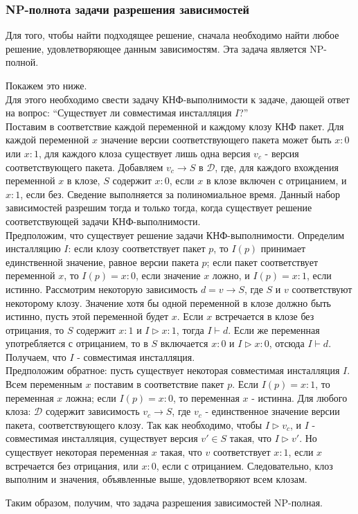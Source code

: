 \subsubsection{NP-полнота задачи разрешения зависимостей}
Для того, чтобы найти подходящее решение, сначала необходимо найти любое
решение, удовлетворяющее данным зависимостям. Эта задача является NP-полной.

Покажем это ниже.\\

Для этого необходимо свести задачу КНФ-выполнимости к задаче, дающей ответ на 
вопрос: ``Существует ли совместимая инсталляция $I$?''\\

Поставим в соответствие каждой переменной и каждому клозу КНФ пакет. Для
каждой переменной $x$ значение версии соответствующего пакета может быть
$x:0$ или $x:1$, для каждого клоза существует лишь одна версия $v_c$ - 
версия соответствующего пакета. Добавляем $v_c \to S$ в $\mathcal{D}$, где,
для каждого вхождения переменной $x$ в клозе, $S$ содержит $x:0$, если
$x$ в клозе включен с отрицанием, и $x:1$, если без. Сведение выполняется за
полиномиальное время. Данный набор зависимостей разрешим тогда и только тогда,
когда существует решение соответствующей задачи КНФ-выполнимости.\\

Предположим, что существует решение задачи КНФ-выполнимости. Определим инсталляцию 
$I$: если клозу соответствует пакет $p$, то $I(p)$ принимает единственной значение, 
равное версии пакета $p$; если пакет соответствует переменной $x$, то $I(p) = x:0$,
если значение $x$ ложно, и $I(p) = x:1$, если истинно. Рассмотрим некоторую зависимость
$d = v \to S$, где $S$ и $v$ соответствуют некоторому клозу. Значение хотя бы одной
переменной в клозе должно быть истинно, пусть этой переменной будет $x$. Если $x$ 
встречается в клозе без отрицания, то $S$ содержит $x:1$ и $I \rhd x:1$, тогда $I \vdash d$.
Если же переменная употребляется с отрицанием, то в $S$ включается $x:0$ и $I \rhd x:0$, отсюда 
$I \vdash d$. Получаем, что  $I$ - совместимая инсталляция.\\

Предположим обратное: пусть существует некоторая совместимая инсталляция $I$. Всем переменным 
$x$ поставим в соответствие пакет $p$. Если $I(p) = x:1$, то переменная $x$ ложна; если 
$I(p) = x:0$, то переменная $x$ - истинна. Для любого клоза: $\mathcal{D}$ содержит зависимость
$v_c \to S$, где $v_c$ - единственное значение версии пакета, соответствующего клозу. Так как 
необходимо, чтобы $I \rhd v_c$, и $I$ - совместимая инсталляция, существует версия $v' \in S$
такая, что $I \rhd v'$. Но существует  некоторая переменная $x$ такая, что $v$ соответствует 
$x:1$, если $x$ встречается без отрицания, или $x:0$, если с отрицанием. Следовательно, клоз 
выполним и значения, объявленные выше, удовлетворяют всем клозам.

Таким образом, получим, что задача разрешения зависимостей  NP-полная.\\


